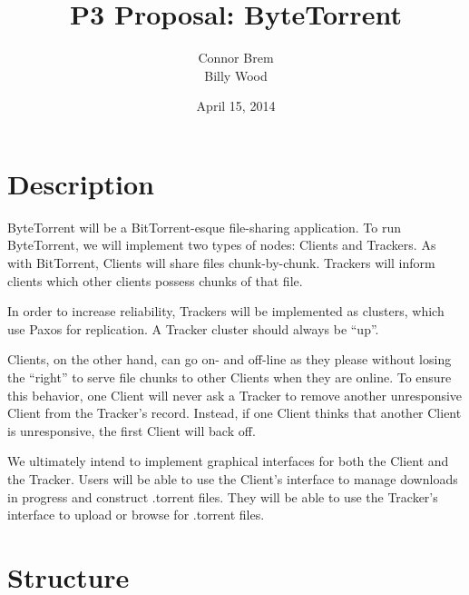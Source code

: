 \documentclass[12pt]{article}
\title{P3 Proposal: ByteTorrent}
\author{Connor Brem\\Billy Wood}
\date{April 15, 2014}
\begin{document}
\maketitle

\section*{Description}

ByteTorrent will be a BitTorrent-esque file-sharing application.
To run ByteTorrent, we will implement two types of nodes: Clients and Trackers.
As with BitTorrent, Clients will share files chunk-by-chunk. Trackers will
inform clients which other clients possess chunks of that file.

In order to increase reliability, Trackers will be implemented as clusters,
which use Paxos for replication. A Tracker cluster should always be ``up''.

Clients, on the other hand, can go on- and off-line as they please without
losing the ``right'' to serve file chunks to other Clients when they are online.
To ensure this behavior, one Client will never ask a Tracker to remove another
unresponsive Client from the Tracker's record. Instead, if one Client thinks
that another Client is unresponsive, the first Client will back off.

We ultimately intend to implement graphical interfaces for both
the Client and the Tracker.
Users will be able to use the Client's interface to manage downloads in
progress and construct .torrent files. They will be able to use the Tracker's
interface to upload or browse for .torrent files.


\section*{Structure}
\end{document}
